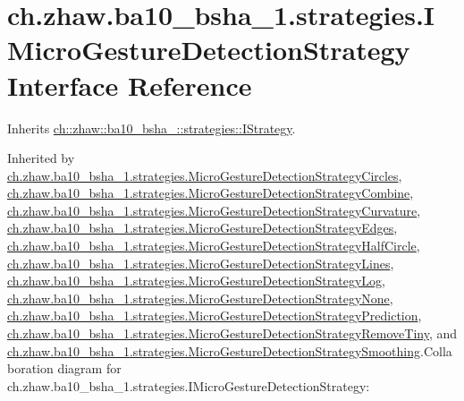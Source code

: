 \hypertarget{interfacech_1_1zhaw_1_1ba10__bsha__1_1_1strategies_1_1IMicroGestureDetectionStrategy}{
\section{ch.zhaw.ba10\_\-bsha\_\-1.strategies.IMicroGestureDetectionStrategy Interface Reference}
\label{interfacech_1_1zhaw_1_1ba10__bsha__1_1_1strategies_1_1IMicroGestureDetectionStrategy}
}


Inherits \hyperlink{interfacech_1_1zhaw_1_1ba10__bsha__1_1_1strategies_1_1IStrategy}{ch::zhaw::ba10\_\-bsha\_::strategies::IStrategy}.

Inherited by \hyperlink{classch_1_1zhaw_1_1ba10__bsha__1_1_1strategies_1_1MicroGestureDetectionStrategyCircles}{ch.zhaw.ba10\_\-bsha\_\-1.strategies.MicroGestureDetectionStrategyCircles}, \hyperlink{classch_1_1zhaw_1_1ba10__bsha__1_1_1strategies_1_1MicroGestureDetectionStrategyCombine}{ch.zhaw.ba10\_\-bsha\_\-1.strategies.MicroGestureDetectionStrategyCombine}, \hyperlink{classch_1_1zhaw_1_1ba10__bsha__1_1_1strategies_1_1MicroGestureDetectionStrategyCurvature}{ch.zhaw.ba10\_\-bsha\_\-1.strategies.MicroGestureDetectionStrategyCurvature}, \hyperlink{classch_1_1zhaw_1_1ba10__bsha__1_1_1strategies_1_1MicroGestureDetectionStrategyEdges}{ch.zhaw.ba10\_\-bsha\_\-1.strategies.MicroGestureDetectionStrategyEdges}, \hyperlink{classch_1_1zhaw_1_1ba10__bsha__1_1_1strategies_1_1MicroGestureDetectionStrategyHalfCircle}{ch.zhaw.ba10\_\-bsha\_\-1.strategies.MicroGestureDetectionStrategyHalfCircle}, \hyperlink{classch_1_1zhaw_1_1ba10__bsha__1_1_1strategies_1_1MicroGestureDetectionStrategyLines}{ch.zhaw.ba10\_\-bsha\_\-1.strategies.MicroGestureDetectionStrategyLines}, \hyperlink{classch_1_1zhaw_1_1ba10__bsha__1_1_1strategies_1_1MicroGestureDetectionStrategyLog}{ch.zhaw.ba10\_\-bsha\_\-1.strategies.MicroGestureDetectionStrategyLog}, \hyperlink{classch_1_1zhaw_1_1ba10__bsha__1_1_1strategies_1_1MicroGestureDetectionStrategyNone}{ch.zhaw.ba10\_\-bsha\_\-1.strategies.MicroGestureDetectionStrategyNone}, \hyperlink{classch_1_1zhaw_1_1ba10__bsha__1_1_1strategies_1_1MicroGestureDetectionStrategyPrediction}{ch.zhaw.ba10\_\-bsha\_\-1.strategies.MicroGestureDetectionStrategyPrediction}, \hyperlink{classch_1_1zhaw_1_1ba10__bsha__1_1_1strategies_1_1MicroGestureDetectionStrategyRemoveTiny}{ch.zhaw.ba10\_\-bsha\_\-1.strategies.MicroGestureDetectionStrategyRemoveTiny}, and \hyperlink{classch_1_1zhaw_1_1ba10__bsha__1_1_1strategies_1_1MicroGestureDetectionStrategySmoothing}{ch.zhaw.ba10\_\-bsha\_\-1.strategies.MicroGestureDetectionStrategySmoothing}.Collaboration diagram for ch.zhaw.ba10\_\-bsha\_\-1.strategies.IMicroGestureDetectionStrategy:\nopagebreak
